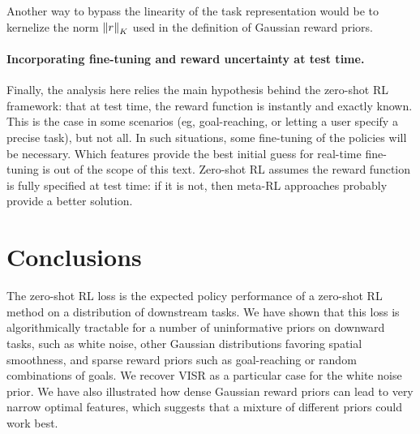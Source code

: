 \documentclass[11pt,a4paper]{article}
\begin{document}
Another way to bypass the linearity of the task representation would be
to kernelize the norm $\left\lVert r\right\rVert_K$ used in the definition of Gaussian
reward priors.

\paragraph{Incorporating fine-tuning and reward uncertainty at test
time.} Finally, the analysis here relies the main hypothesis behind
the zero-shot RL framework: that at test time, the reward function is
instantly and exactly known. This is the case in some scenarios (eg,
goal-reaching, or letting a user specify a precise task), but not all. In
such situations, some fine-tuning of the policies will be necessary.
Which features provide the best initial guess for real-time fine-tuning is
out of the scope of this text. Zero-shot RL assumes the reward function is fully
specified at test time: if it is not, then meta-RL approaches
\cite{beck2023survey}
probably provide a better solution.

\section{Conclusions}

The zero-shot RL loss is the expected policy performance of a zero-shot
RL method on a distribution of downstream tasks. We have shown that this
loss is algorithmically tractable for a number of uninformative priors on
downward tasks, such as white noise, other Gaussian distributions
favoring spatial smoothness, and sparse reward priors such as
goal-reaching or random combinations of goals. We recover VISR as
a particular case for the white noise prior. We have also illustrated how
dense Gaussian reward priors can lead to very narrow optimal features,
which suggests that a mixture of different priors could work best.
\end{document}
